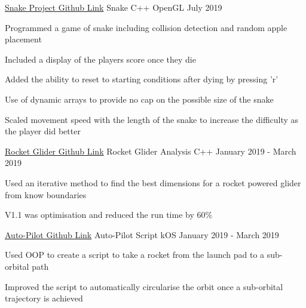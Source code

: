 

\begin{cventries}
    \cventry
    {\href{https://github.com/HDonovan96/Snake}{Snake Project Github Link}}
    {Snake}
    {C++ OpenGL}
    {July 2019}
    {
        \begin{cvitems}
            \item {Programmed a game of snake including collision detection and random apple placement}
            \item {Included a display of the players score once they die}
            \item {Added the ability to reset to starting conditions after dying by pressing 'r'}
            \item {Use of dynamic arrays to provide no cap on the possible size of the snake}
            \item {Scaled movement speed with the length of the snake to increase the difficulty as the player did better }
        \end{cvitems}  
    }

    \cventry
    {\href{https://github.com/HDonovan96/Iterative_Rocket_Glider_Design}{Rocket Glider Github Link}}
    {Rocket Glider Analysis}
    {C++}
    {January 2019 - March 2019}
    {
        \begin{cvitems}
            \item Used an iterative method to find the best dimensions for a rocket powered glider from know boundaries
            \item V1.1 was optimisation and reduced the run time by 60\%
        \end{cvitems}
    }
    
    \cventry
    {\href{https://github.com/HDonovan96/Programming_Nursery/tree/master/KOS}{Auto-Pilot Github Link}}
    {Auto-Pilot Script}
    {kOS}
    {January 2019 - March 2019}
    {
        \begin{cvitems}
            \item Used OOP to create a script to take a rocket from the launch pad to a sub-orbital path
            \item Improved the script to automatically circularise the orbit once a sub-orbital trajectory is achieved
        \end{cvitems}
    }
\end{cventries}